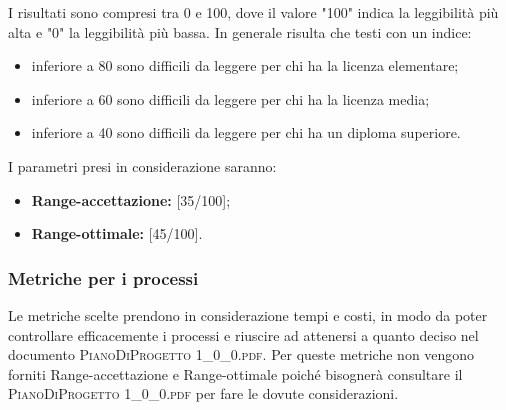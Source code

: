 	
	I risultati sono compresi tra 0 e 100, dove il valore "100" indica la leggibilità più alta e "0" la leggibilità più bassa. In generale risulta che testi con un indice:
	\begin{itemize}
		\item inferiore a 80 sono difficili da leggere per chi ha la licenza elementare;
		\item inferiore a 60 sono difficili da leggere per chi ha la licenza media;
		\item inferiore a 40 sono difficili da leggere per chi ha un diploma superiore.
	\end{itemize}
	
	I parametri presi in considerazione saranno:
	
	\begin{itemize}
		\item \textbf{Range-accettazione: }[35/100];
		\item \textbf{Range-ottimale: }[45/100].
	\end{itemize}
	
	\subsubsection{Metriche per i processi}
	Le metriche scelte prendono in considerazione tempi e costi, in modo da poter controllare efficacemente i processi e riuscire ad attenersi a quanto deciso nel documento \textsc{PianoDiProgetto 1\_0\_0.pdf}. 
	Per queste metriche non vengono forniti Range-accettazione e Range-ottimale poiché bisognerà consultare il \textsc{PianoDiProgetto 1\_0\_0.pdf} per fare le dovute considerazioni.
	
